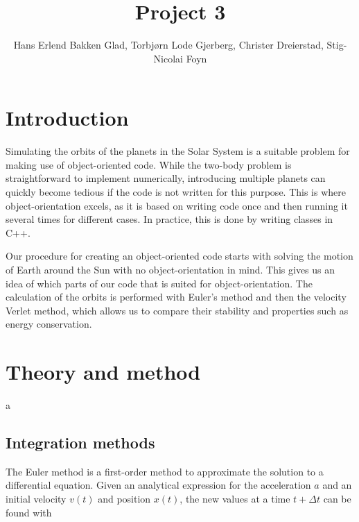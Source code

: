 \documentclass{emulateapj}
\begin{document}
\title{Project 3}

\author{Hans Erlend Bakken Glad, Torbjørn Lode Gjerberg, Christer Dreierstad, Stig-Nicolai Foyn}





\begin{abstract}

\end{abstract}

\section{Introduction}
\label{sec:introduction}

Simulating the orbits of the planets in the Solar System is a suitable problem for making use of object-oriented code. While the two-body problem is straightforward to implement numerically, introducing multiple planets can quickly become tedious if the code is not written for this purpose. This is where object-orientation excels, as it is based on writing code once and then running it several times for different cases. In practice, this is done by writing classes in C++.

Our procedure for creating an object-oriented code starts with solving the motion of Earth around the Sun with no object-orientation in mind. This gives us an idea of which parts of our code that is suited for object-orientation. The calculation of the orbits is performed with Euler's method and then the velocity Verlet method, which allows us to compare their stability and properties such as energy conservation.


\section{Theory and method}
\label{sec:method}
a
\subsection{Integration methods}
The Euler method is a first-order method to approximate the solution to a differential equation. Given an analytical expression for the acceleration $a$ and an initial velocity $v(t)$ and position $x(t)$, the new values at a time $t + \Delta t$ can be found with
\end{document}
